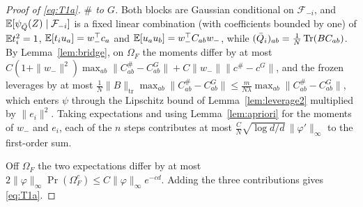 \begin{proof}[Proof of \eqref{eq:T1a}]
\emph{$\#$ to $G$.} Both blocks are Gaussian conditional on $\mathcal F_{-i}$, and
$\mathbb{E}[\psi_{\bar Q}(Z)\mid\mathcal F_{-i}]$ is a fixed linear combination (with coefficients bounded by one) of
$\mathbb{E} t_i^2=1$, $\mathbb{E}[t_iu_a]=w_-^\top c_a$ and $\mathbb{E}[u_au_b]=w_-^\top C_{ab}w_-$, while $(\bar Q_i)_{ab}=\frac1N\operatorname{Tr}(BC_{ab})$.
By Lemma~\ref{lem:bridge}, on $\Omega_F$ the moments differ by at most
$C(1+\|w_-\|^2)\max_{ab}\|C^\#_{ab}-C^G_{ab}\|+C\|w_-\|\|c^\#-c^G\|$, and the frozen leverages by at most
$\frac1N\|B\|_{\mathrm{tr}}\max_{ab}\|C^\#_{ab}-C^G_{ab}\|\le\frac{m}{N\lambda}\max_{ab}\|C^\#_{ab}-C^G_{ab}\|$, which enters
$\psi$ through the Lipschitz bound of Lemma~\ref{lem:leverage2} multiplied by $\|e_i\|^2$. Taking expectations
and using Lemma~\ref{lem:apriori} for the moments of $w_-$ and $e_i$, each of the $n$ steps contributes at most
$\frac{C}{N}\sqrt{\log d/d}\,\|\varphi'\|_\infty$ to the first-order sum.

Off $\Omega_F$ the two expectations differ by at most $2\|\varphi\|_\infty\Pr(\Omega_F^c)\le C\|\varphi\|_\infty e^{-cd}$.
Adding the three contributions gives \eqref{eq:T1a}.
\end{proof}

